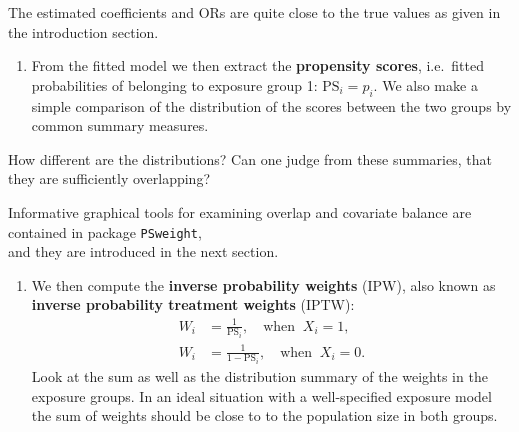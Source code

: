 \documentclass[
]{book}
\newenvironment{Shaded}{\begin{snugshade}}{\end{snugshade}}
\newcommand{\AttributeTok}[1]{\textcolor[rgb]{0.13,0.29,0.53}{#1}}
\newcommand{\DecValTok}[1]{\textcolor[rgb]{0.00,0.00,0.81}{#1}}
\newcommand{\FunctionTok}[1]{\textcolor[rgb]{0.13,0.29,0.53}{\textbf{#1}}}
\newcommand{\NormalTok}[1]{#1}
\newcommand{\OtherTok}[1]{\textcolor[rgb]{0.56,0.35,0.01}{#1}}
\newcommand{\SpecialCharTok}[1]{\textcolor[rgb]{0.81,0.36,0.00}{\textbf{#1}}}
\newcommand{\StringTok}[1]{\textcolor[rgb]{0.31,0.60,0.02}{#1}}
\providecommand{\tightlist}{%
  \setlength{\itemsep}{0pt}\setlength{\parskip}{0pt}}
\begin{document}
The estimated coefficients and ORs are quite close to the true values as
given in the introduction section.

\begin{enumerate}
\def\labelenumi{\arabic{enumi}.}
\setcounter{enumi}{1}
\tightlist
\item
  From the fitted model we then extract the \textbf{propensity scores},
  i.e.~fitted probabilities of belonging to exposure group 1:
  \(\text{PS}_i = \widehat{p_i}\). We also make a simple comparison of
  the distribution of the scores between the two groups by common
  summary measures.
\end{enumerate}

\begin{Shaded}
\end{Shaded}

How different are the distributions? Can one judge from these summaries,
that they are sufficiently overlapping?

Informative graphical tools for examining overlap and covariate balance
are contained in package \texttt{PSweight},\\
and they are introduced in the next section.

\begin{enumerate}
\def\labelenumi{\arabic{enumi}.}
\setcounter{enumi}{2}
\tightlist
\item
  We then compute the \textbf{inverse probability weights} (IPW), also
  known as \textbf{inverse probability treatment weights} (IPTW):
  \[\begin{aligned}
   W_i & = \frac{1}{\text{PS}_i}, \quad \text{when }\ X_i=1, \\
   W_i & = \frac{1}{1-\text{PS}_i}, \quad \text{when }\ X_i=0 . 
  \end{aligned} \] Look at the sum as well as the distribution summary
  of the weights in the exposure groups. In an ideal situation with a
  well-specified exposure model the sum of weights should be close to
  to the population size in both groups.
\end{enumerate}

\begin{Shaded}
\end{Shaded}
\end{document}
